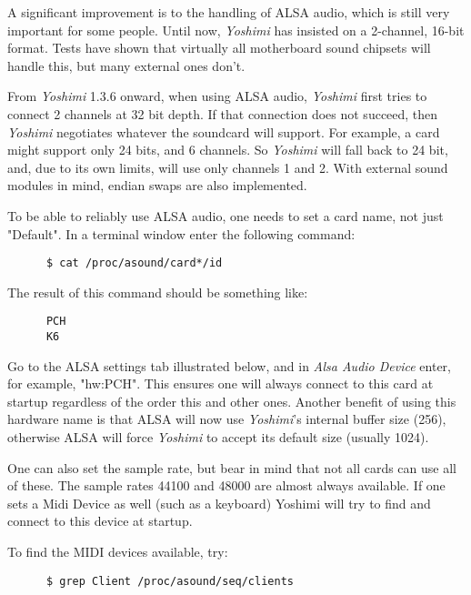    A significant improvement is to the handling of ALSA audio, which is still
   very important for some people. Until now, \textsl{Yoshimi} has insisted
   on a 2-channel, 16-bit format. Tests have shown that virtually all
   motherboard sound chipsets will handle this, but many external ones don't.

   From \textsl{Yoshimi} 1.3.6 onward, when using ALSA audio,
   \textsl{Yoshimi} first tries to connect 2 channels at 32 bit depth.  If
   that connection does not succeed, then \textsl{Yoshimi} negotiates
   whatever the soundcard will support.  For example, a card might support
   only 24 bits, and 6 channels.  So \textsl{Yoshimi} will fall back to
   24 bit, and, due to its own limits, will use only channels 1 and 2.
   With external sound modules in mind, endian swaps are also implemented.

   To be able to reliably use ALSA audio, one needs to set a card name, not just
   "Default".  In a terminal window enter the following command:

   \begin{verbatim}
      $ cat /proc/asound/card*/id
   \end{verbatim}

   The result of this command should be something like:

   \begin{verbatim}
      PCH
      K6
   \end{verbatim}

   Go to the ALSA settings tab illustrated below, and in
   \textsl{Alsa Audio Device} enter, for example, "hw:PCH".
   This ensures one will always connect to this card at startup regardless of
   the order this and other ones.  Another benefit of using this hardware name
   is that ALSA will now use \textsl{Yoshimi}'s internal
   buffer size (256), otherwise ALSA will force \textsl{Yoshimi} to accept its
   default size (usually 1024).

   One can also set the sample rate, but bear in mind that not all cards can use
   all of these.  The sample rates 44100 and 48000 are almost always available.
   If one sets a Midi Device as well (such as a keyboard) Yoshimi will try to
   find and connect to this device at startup.

   To find the MIDI devices available, try:

   \begin{verbatim}
      $ grep Client /proc/asound/seq/clients
   \end{verbatim}

